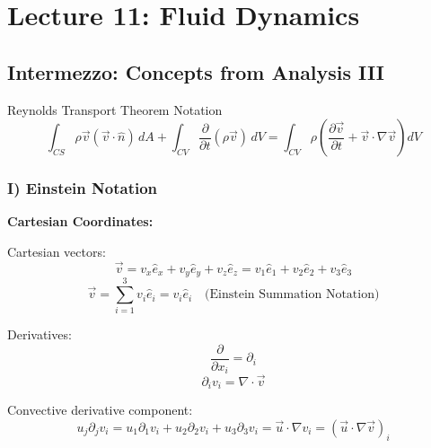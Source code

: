 \section{Lecture 11: Fluid Dynamics}

\subsection{Intermezzo: Concepts from Analysis III}

\begin{eqbox}{Reynolds Transport Theorem Notation}
$$  \int_{CS} \rho \vec{v} (\vec{v} \cdot \hat{n}) \, dA + \int_{CV} \frac{\partial}{\partial t} (\rho \vec{v}) \, dV = \int_{CV} \rho \left( \frac{\partial \vec{v}}{\partial t} + \vec{v} \cdot \nabla \vec{v} \right) dV$$
\end{eqbox}

\subsubsection{I) Einstein Notation}

\textbf{Cartesian Coordinates:}

\begin{center}
\end{center}

Cartesian vectors: 
$$ \vec{v} = v_x \hat{e}_x + v_y \hat{e}_y + v_z \hat{e}_z = v_1 \hat{e}_1 + v_2 \hat{e}_2 + v_3 \hat{e}_3 $$
$$ \vec{v} = \sum_{i=1}^3 v_i \hat{e}_i = v_i \hat{e}_i \quad \text{(Einstein Summation Notation)} $$

Derivatives:
$$ \frac{\partial}{\partial x_i} = \partial_i $$
$$ \partial_i v_i = \nabla \cdot \vec{v} $$

Convective derivative component:
$$ u_j \partial_j v_i = u_1 \partial_1 v_i + u_2 \partial_2 v_i + u_3 \partial_3 v_i = \vec{u} \cdot \nabla v_i = (\vec{u} \cdot \nabla \vec{v})_i $$

